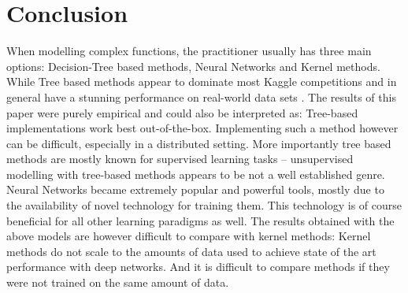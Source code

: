 \documentclass{article} %
\begin{document}

\section{Conclusion}
When modelling complex functions, the practitioner usually has three main options: Decision-Tree based methods, Neural Networks and Kernel methods. While Tree based methods appear to dominate most Kaggle competitions and in general have a stunning performance on real-world data sets \cite{Caruana2006}. The results of this paper were purely empirical and could also be interpreted as: Tree-based implementations work best out-of-the-box. Implementing such a method however can be difficult, especially in a distributed setting. More importantly tree based methods are mostly known for supervised learning tasks -- unsupervised modelling with tree-based methods appears to be not a well established genre. Neural Networks became extremely popular and powerful tools, mostly due to the availability of novel technology for training them. This technology is of course beneficial for all other learning paradigms as well. The results obtained with the above models are however difficult to compare with kernel methods: Kernel methods do not scale to the amounts of data used to achieve state of the art performance with deep networks. And it is difficult to compare methods if they were not trained on the same amount of data.
\end{document}
